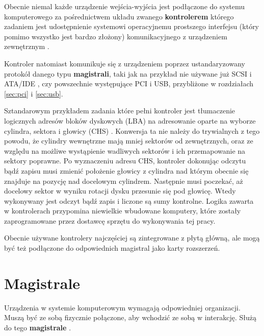 \documentclass[shortabstract,inz]{iithesis}
\begin{document}
Obecnie niemal każde urządzenie wejścia-wyjścia jest podłączone do
systemu komputerowego za pośrednictwem układu zwanego \textbf{kontrolerem}
którego zadaniem jest udostępnienie systemowi operacyjnemu
prostszego interfejsu (który pomimo wszystko jest bardzo złożony)
komunikacyjnego z urządzeniem zewnętrznym \cite{wiki:controller}\cite{book:tanenbaum_hardware}.
 
Kontroler natomiast komunikuje się z
urządzeniem poprzez ustandaryzowany protokół danego typu \textbf{magistrali}, taki jak
na przykład nie używane już SCSI \cite{scsi} i ATA/IDE \cite{ata_ide}, czy powszechnie występujące
PCI i USB, przybliżone w rozdziałach \ref{sec:pci} i \ref{sec:usb}.

Sztandarowym przykładem zadania które pełni kontroler jest tłumaczenie
logicznych adresów bloków dyskowych \cite{book:memory_systems_chapter_18} 
(LBA) na adresowanie oparte na wyborze cylindra, sektora i głowicy (CHS) \cite{book:tanenbaum_dyski}. 
Konwersja ta nie należy do
trywialnych z tego powodu, że cylindry wewnętrzne mają mniej sektorów
od zewnętrznych, oraz ze względu na możliwe wystąpienie wadliwych
sektorów i ich przemapowanie na sektory poprawne.  Po wyznaczeniu
adresu CHS, kontroler dokonując odczytu bądź zapisu musi zmienić
położenie głowicy z cylindra nad którym obecnie się znajduje na
pozycję nad docelowym cylindrem. Następnie musi poczekać, aż docelowy
sektor w wyniku rotacji dysku przesunie się pod głowicę. Wtedy
wykonywany jest odczyt bądź zapis i liczone są sumy kontrolne. Logika
zawarta w kontrolerach przypomina niewielkie wbudowane komputery,
które zostały zaprogramowane przez dostawcę sprzętu do
wykonywania tej pracy.

Obecnie używane kontrolery najczęściej są zintegrowane z płytą główną, 
ale mogą być też podłączone do odpowiednich magistral jako karty rozszerzeń.

\section{Magistrale} %


Urządzenia w systemie komputerowym wymagają odpowiedniej organizacji.
Muszą być ze sobą fizycznie połączone, aby wchodzić ze sobą w interakcję.
Służą do tego \textbf{magistrale} \cite{book:tanenbaum_hardware}.
\end{document}
